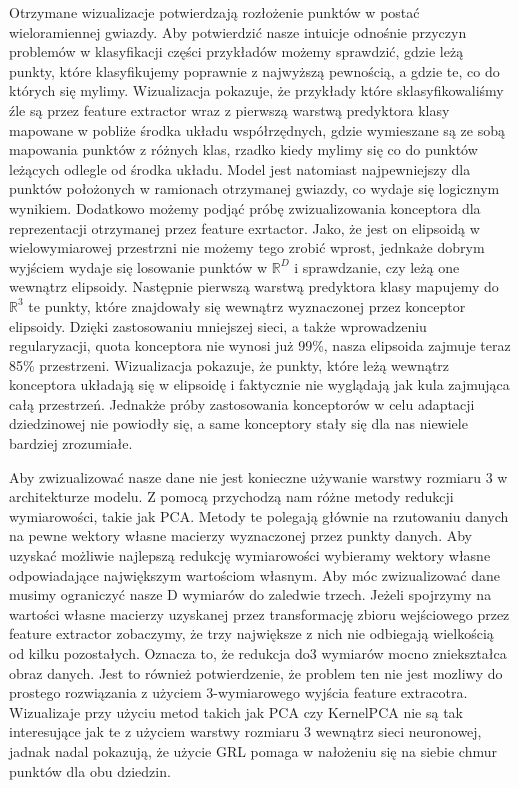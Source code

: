 \documentclass{article}
\begin{document}
Otrzymane wizualizacje potwierdzają rozłożenie punktów w postać wieloramiennej gwiazdy. Aby potwierdzić nasze intuicje odnośnie przyczyn problemów w klasyfikacji części przykładów możemy sprawdzić, gdzie leżą punkty, które klasyfikujemy poprawnie z najwyższą pewnością, a gdzie te, co do których się mylimy. Wizualizacja pokazuje, że przykłady które sklasyfikowaliśmy źle są przez feature extractor wraz z pierwszą warstwą predyktora klasy mapowane w pobliże środka układu współrzędnych, gdzie wymieszane są ze sobą mapowania punktów z różnych klas, rzadko kiedy mylimy się co do punktów leżących odlegle od środka układu. Model jest natomiast najpewniejszy dla punktów położonych w ramionach otrzymanej gwiazdy, co wydaje się logicznym wynikiem. Dodatkowo możemy podjąć próbę zwizualizowania konceptora dla reprezentacji otrzymanej przez feature exrtactor. Jako, że jest on elipsoidą w wielowymiarowej przestrzni nie możemy tego zrobić wprost, jednkaże dobrym wyjściem wydaje się losowanie punktów w $\mathbb{R}^{D}$ i sprawdzanie, czy leżą one wewnątrz elipsoidy. Następnie pierwszą warstwą predyktora klasy mapujemy do $\mathbb{R}^{3}$ te punkty, które znajdowały się wewnątrz wyznaczonej przez konceptor elipsoidy. Dzięki zastosowaniu mniejszej sieci, a także wprowadzeniu regularyzacji, quota konceptora nie wynosi już 99\%, nasza elipsoida zajmuje teraz 85\% przestrzeni. Wizualizacja pokazuje, że punkty, które leżą wewnątrz konceptora układają się w elipsoidę i faktycznie nie wyglądają jak kula zajmująca całą przestrzeń. Jednakże próby zastosowania konceptorów w celu adaptacji dziedzinowej nie powiodły się, a same konceptory stały się dla nas niewiele bardziej zrozumiałe.
\par
Aby zwizualizować nasze dane nie jest konieczne używanie warstwy rozmiaru 3 w architekturze modelu. Z pomocą przychodzą nam różne metody redukcji wymiarowości, takie jak PCA. Metody te polegają głównie na rzutowaniu danych na pewne wektory własne macierzy wyznaczonej przez punkty danych. Aby uzyskać możliwie najlepszą redukcję wymiarowości wybieramy wektory własne odpowiadające największym wartościom własnym. Aby móc zwizualizować dane musimy ograniczyć nasze D wymiarów do zaledwie trzech. Jeżeli spojrzymy na wartości własne macierzy uzyskanej przez transformację zbioru wejściowego przez feature extractor zobaczymy, że trzy największe z nich nie odbiegają wielkością od kilku pozostałych. Oznacza to, że redukcja do3 wymiarów mocno zniekształca obraz danych. Jest to również potwierdzenie, że problem ten nie jest mozliwy do prostego rozwiązania z użyciem 3-wymiarowego wyjścia feature extracotra. Wizualizaje przy użyciu metod takich jak PCA czy KernelPCA nie są tak interesujące jak te z użyciem warstwy rozmiaru 3 wewnątrz sieci neuronowej, jadnak nadal pokazują, że użycie GRL pomaga w nałożeniu się na siebie chmur punktów dla obu dziedzin.
\end{document}
